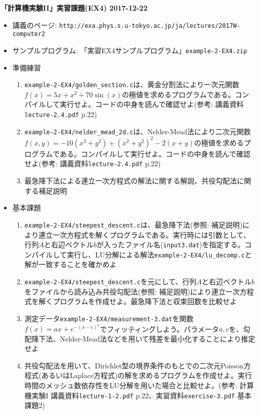 \documentclass[11pt]{jarticle}
\begin{document}
\noindent
{\bf\large 「計算機実験II」実習課題(EX4) 2017-12-22}
\\[-0.5em]

\noindent
\begin{itemize}
\item 講義のページ: \verb+http://exa.phys.s.u-tokyo.ac.jp/ja/lectures/2017W-computer2+

\item サンプルプログラム: 「実習EX4サンプルプログラム」{\tt example-2-EX4.zip}

\item 準備練習
  
\begin{enumerate}
  \item {\tt example-2-EX4/golden\_section.c}は、黄金分割法により一次元関数$f(x) = 5x+x^2+70\sin(x)$の極値を求めるプログラムである。コンパイルして実行せよ。コードの中身を読んで確認せよ(参考: 講義資料{\tt lecture-2.4.pdf} p.22)
  \item {\tt example-2-EX4/nelder\_mead\_2d.c}は、Nelder-Mead法により二次元関数$f(x, y) = −10(x^2 + y^2) + (x^2 + y^2)^2 − 2(x + y)$の極値を求めるプログラムである。コンパイルして実行せよ。コードの中身を読んで確認せよ(参考: 講義資料{\tt lecture-2.4.pdf} p.22)
  \item 最急降下法による連立一次方程式の解法に関する解説、共役勾配法に関する補足説明
\end{enumerate}

\item 基本課題
  \begin{enumerate}
  \item {\tt example-2-EX4/steepest\_descent.c}は、最急降下法(参照: 補足説明)により連立一次方程式を解くプログラムである。実行時には引数として、行列$A$と右辺ベクトル$b$が入ったファイル名({\tt input3.dat})を指定する。コンパイルして実行し、LU分解による解法{\tt example-2-EX4/lu\_decomp.c}と解が一致することを確かめよ
  \item {\tt example-2-EX4/steepest\_descent.c}を元にして、行列$A$と右辺ベクトル$b$をファイルから読み込み共役勾配法(参照: 補足説明)により連立一次方程式を解くプログラムを作成せよ。最急降下法と収束回数を比較せよ
  \item 測定データ{\tt example-2-EX4/measurement-3.dat}を関数$f(x)=ax+e^{−(x−c)^2}$でフィッティングしよう。パラメータ$a, c$を、勾配降下法、Nelder-Mead法などを用いて残差を最小化することにより推定せよ
  \item 共役勾配法を用いて、Dirichlet型の境界条件のもとでの二次元Poisson方程式(あるいはLaplace方程式)の解を求めるプログラムを作成せよ。実行時間のメッシュ数依存性をLU分解を用いた場合と比較せよ。(参考: 計算機実験I 講義資料{\tt lecture-1-2.pdf} p.22、実習資料{\tt exercise-3.pdf} 基本課題2)


\end{enumerate}
\end{itemize}
\end{document}
